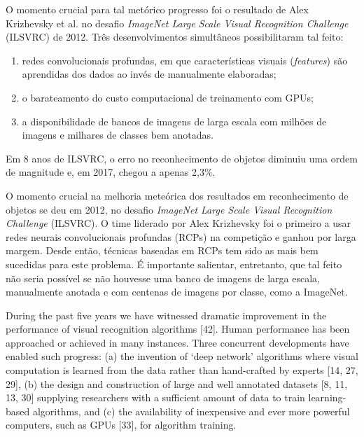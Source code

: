 \documentclass[
12pt, %
a4paper, %
onecolumn, %
]{article}
\begin{document}
O momento crucial para tal metórico progresso foi o resultado de Alex Krizhevsky et al.\cite{alexnet} no desafio \textit{ImageNet Large Scale Visual Recognition Challenge}  (ILSVRC) de 2012\cite{goodfellow}. Três desenvolvimentos simultâneos possibilitaram tal feito\cite{horn}: 
\begin{enumerate}
  \item redes convolucionais profundas, em que características visuais (\textit{features}) são aprendidas dos dados ao invés de manualmente elaboradas;
  \item o barateamento do custo computacional de treinamento com GPUs;
  \item a disponibilidade de bancos de imagens de larga escala com milhões de imagens e milhares de classes bem anotadas. 
\end{enumerate}
Em 8 anos de ILSVRC, o erro no reconhecimento de objetos diminuiu uma ordem de magnitude\cite{fei} e, em 2017, chegou a apenas 2,3\%. 

O momento crucial na melhoria meteórica dos resultados em reconhecimento de objetos se deu em 2012, no desafio \textit{ImageNet Large Scale Visual Recognition Challenge}  (ILSVRC)\cite{goodfellow}. O time liderado por Alex Krizhevsky foi o primeiro a usar redes neurais convolucionais profundas (RCPs) na competição e ganhou por larga margem\cite{alexnet}. Desde então, técnicas baseadas em RCPs tem sido as mais bem sucedidas para este problema. É importante salientar, entretanto, que tal feito não seria possível se não houvesse uma banco de imagens de larga escala, manualmente anotada e com centenas de imagens por classe, como a ImageNet.

During the past five years we have witnessed dramatic improvement in the performance
of visual recognition algorithms [42]. Human performance has been approached
or achieved in many instances. Three concurrent developments have enabled
such progress: (a) the invention of ‘deep network’ algorithms where visual
computation is learned from the data rather than hand-crafted by experts [14, 27, 29],
(b) the design and construction of large and well annotated datasets [8, 11, 13, 30]
supplying researchers with a sufficient amount of data to train learning-based algorithms,
and (c) the availability of inexpensive and ever more powerful computers,
such as GPUs [33], for algorithm training.
\end{document}
